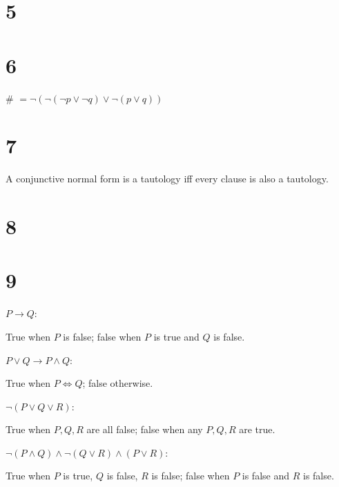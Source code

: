 \documentclass[10pt]{article}
\begin{document}

\section*{5}



\section*{6}
{\small \#} $= \lnot (\lnot (\lnot p \lor \lnot q) \lor \lnot (p \lor q))$


\section*{7}
A conjunctive normal form is a tautology iff every clause is also a tautology.


\section*{8}


\section*{9}
\begin{description*}
  \item[$P\to Q$:] 

  True when $P$ is false; false when $P$ is true and $Q$ is false.

  \item[$P \lor Q \to P \land Q$:]

  True when $P\iff Q$; false otherwise.

  \item[$\lnot (P \lor Q \lor R)$:]

  True when $P,Q,R$ are all false; false when any $P,Q,R$ are true.

  \item[$\lnot (P \land Q) \land \lnot (Q \lor R) \land (P\lor R)$:]

  True when $P$ is true, $Q$ is false, $R$ is false; false when $P$ is false and $R$ is false.


\end{description*}
\end{document}
